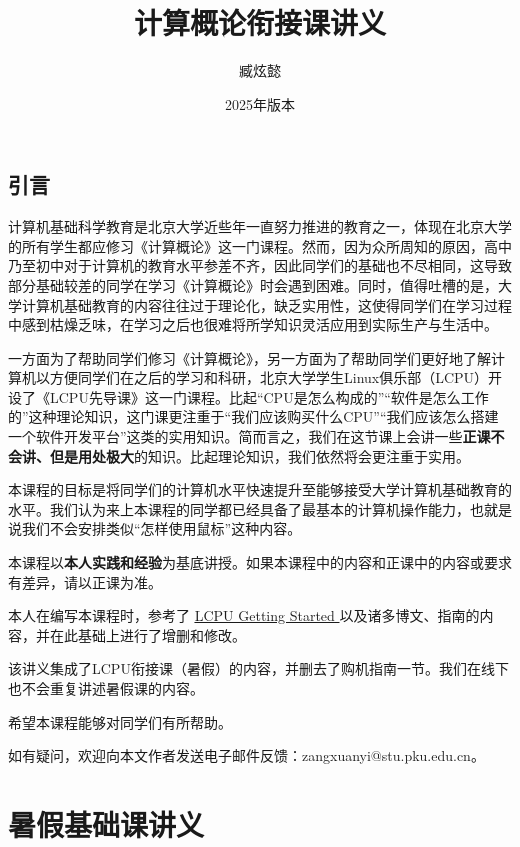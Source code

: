 \documentclass[12pt, openany]{book}
\title{\Huge\textbf{计算概论衔接课讲义}}
\author[a]{臧炫懿}
\affil[a]{北京大学信息科学技术学院}
\date{2025年版本}
\let\oldhref\href
\renewcommand{\href}[2]{%
  \oldhref{#1}{%
    \color{blue}\underline{#2}%
    \raisebox{0.2ex}{\tiny$\nearrow$}%
  }%
}
\begin{document}
\maketitle

\frontmatter

\chapter{引言}

计算机基础科学教育是北京大学近些年一直努力推进的教育之一，体现在北京大学的所有学生都应修习《计算概论》这一门课程。然而，因为众所周知的原因，高中乃至初中对于计算机的教育水平参差不齐，因此同学们的基础也不尽相同，这导致部分基础较差的同学在学习《计算概论》时会遇到困难。同时，值得吐槽的是，大学计算机基础教育的内容往往过于理论化，缺乏实用性，这使得同学们在学习过程中感到枯燥乏味，在学习之后也很难将所学知识灵活应用到实际生产与生活中。

一方面为了帮助同学们修习《计算概论》，另一方面为了帮助同学们更好地了解计算机以方便同学们在之后的学习和科研，北京大学学生Linux俱乐部（LCPU）开设了《LCPU先导课》这一门课程。比起“CPU是怎么构成的”“软件是怎么工作的”这种理论知识，这门课更注重于“我们应该购买什么CPU”“我们应该怎么搭建一个软件开发平台”这类的实用知识。简而言之，我们在这节课上会讲一些\textbf{正课不会讲、但是用处极大}的知识。比起理论知识，我们依然将会更注重于实用。

本课程的目标是将同学们的计算机水平快速提升至能够接受大学计算机基础教育的水平。我们认为来上本课程的同学都已经具备了最基本的计算机操作能力，也就是说我们不会安排类似“怎样使用鼠标”这种内容。

本课程以\textbf{本人实践和经验}为基底讲授。如果本课程中的内容和正课中的内容或要求有差异，请以正课为准。

本人在编写本课程时，参考了\href{https://missing.lcpu.dev}{LCPU Getting Started}以及诸多博文、指南的内容，并在此基础上进行了增删和修改。

该讲义集成了LCPU衔接课（暑假）的内容，并删去了购机指南一节。我们在线下也不会重复讲述暑假课的内容。

希望本课程能够对同学们有所帮助。

如有疑问，欢迎向本文作者发送电子邮件反馈：zangxuanyi@stu.pku.edu.cn。

\mainmatter

\tableofcontents


\part{暑假基础课讲义}
\end{document}
